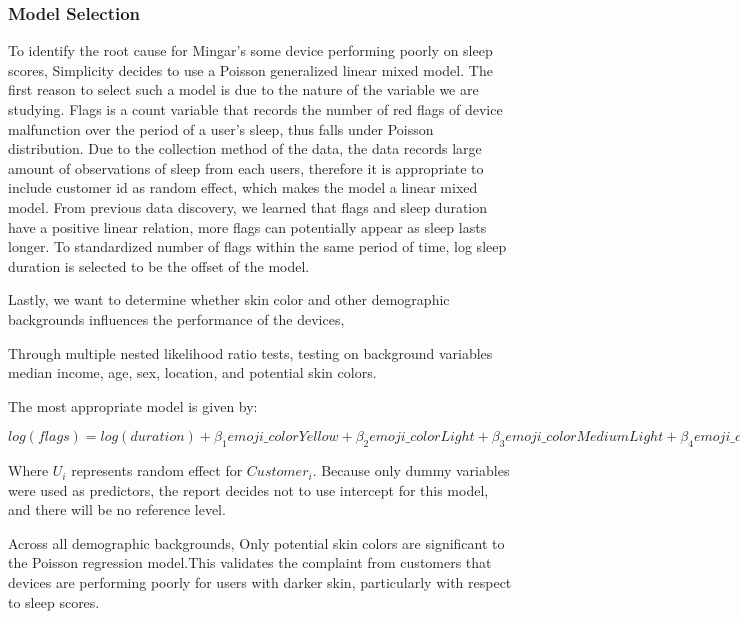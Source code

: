 \documentclass[
          english,
          paper=a4,
              ,captions=tableheading
  ]{scrartcl}
\begin{document}
\hypertarget{model-selection-1}{%
\subsubsection{Model Selection}\label{model-selection-1}}

To identify the root cause for Mingar's some device performing poorly on
sleep scores, Simplicity decides to use a Poisson generalized linear
mixed model. The first reason to select such a model is due to the
nature of the variable we are studying. Flags is a count variable that
records the number of red flags of device malfunction over the period of
a user's sleep, thus falls under Poisson distribution. Due to the
collection method of the data, the data records large amount of
observations of sleep from each users, therefore it is appropriate to
include customer id as random effect, which makes the model a linear
mixed model. From previous data discovery, we learned that flags and
sleep duration have a positive linear relation, more flags can
potentially appear as sleep lasts longer. To standardized number of
flags within the same period of time, log sleep duration is selected to
be the offset of the model.

Lastly, we want to determine whether skin color and other demographic
backgrounds influences the performance of the devices,

Through multiple nested likelihood ratio tests, testing on background
variables median income, age, sex, location, and potential skin colors.

The most appropriate model is given by:

\(log(flags)= log(duration)+{\beta_1}emoji\_colorYellow+{\beta_2}emoji\_colorLight+{\beta_3}emoji\_colorMedium Light+ {\beta_4}emoji\_colorMedium+{\beta_5}emoji\_colorMedium Dark+{\beta_6}emoji\_colorDark+ U_i\)

Where \(U_i\) represents random effect for \(Customer_i\). Because only
dummy variables were used as predictors, the report decides not to use
intercept for this model, and there will be no reference level.

Across all demographic backgrounds, Only potential skin colors are
significant to the Poisson regression model.This validates the complaint
from customers that devices are performing poorly for users with darker
skin, particularly with respect to sleep scores.
\end{document}
